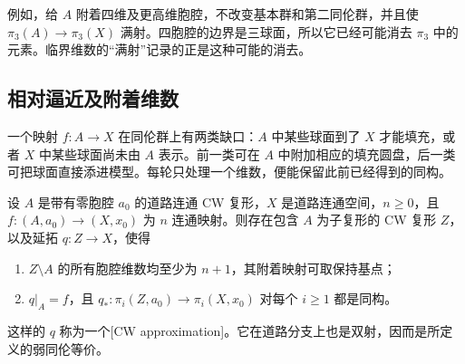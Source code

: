 例如，给 \(A\) 附着四维及更高维胞腔，不改变基本群和第二同伦群，并且使 \(\pi_3(A)\rightarrow\pi_3(X)\) 满射。四胞腔的边界是三球面，所以它已经可能消去 \(\pi_3\) 中的元素。临界维数的“满射”记录的正是这种可能的消去。

\subsection{相对逼近及附着维数}
\label{g2:subsec:0901:02}

一个映射 \(f:A\rightarrow X\) 在同伦群上有两类缺口：\(A\) 中某些球面到了 \(X\) 才能填充，或者 \(X\) 中某些球面尚未由 \(A\) 表示。前一类可在 \(A\) 中附加相应的填充圆盘，后一类可把球面直接添进模型。每轮只处理一个维数，便能保留此前已经得到的同构。

\begin{theorem}[相对 CW 逼近]\label{g2:thm:relative-cw-approximation}
	设 \(A\) 是带有零胞腔 \(a_0\) 的道路连通 CW 复形，\(X\) 是道路连通空间，\(n\ge0\)，且 \(f:(A,a_0)\rightarrow(X,x_0)\) 为 \(n\) 连通映射。则存在包含 \(A\) 为子复形的 CW 复形 \(Z\)，以及延拓 \(q:Z\rightarrow X\)，使得
	\begin{enumerate}
		\item \(Z\setminus A\) 的所有胞腔维数均至少为 \(n+1\)，其附着映射可取保持基点；
		\item \(q|_A=f\)，且 \(q_*:\pi_i(Z,a_0)\rightarrow\pi_i(X,x_0)\) 对每个 \(i\ge1\) 都是同构。
	\end{enumerate}
	这样的 \(q\) 称为一个[CW approximation]。它在道路分支上也是双射，因而是所定义的弱同伦等价。
\end{theorem}
